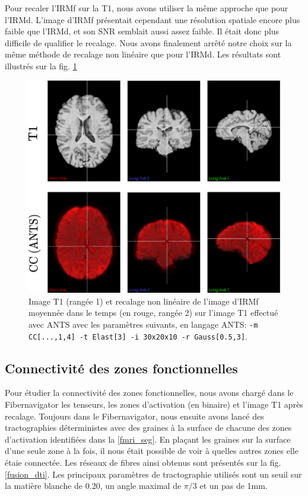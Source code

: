 \documentclass[a4paper]{article}
\begin{document}
Pour recaler l'IRMf sur la T1, nous avons utiliser la même approche que pour l'IRMd. L'image d'IRMf présentait cependant une résolution spatiale encore plus faible que l'IRMd, et son SNR semblait aussi assez faible. Il était donc plus difficile de qualifier le recalage. Nous avons finalement arrêté notre choix sur la même méthode de recalage non linéaire que pour l'IRMd. Les résultats sont illustrés sur la fig. \ref{fmri-to-t1}

\begin{figure}
\begin{center}
\includegraphics[scale=0.5]{fmri-to-t1}
\caption{Image T1 (rangée 1) et recalage non linéaire de l'image d'IRMf moyennée dans le temps (en rouge, rangée 2) sur l'image T1 effectué avec ANTS avec les paramètres suivants, en langage ANTS: \lstinline{-m CC[...,1,4] -t Elast[3] -i 30x20x10 -r Gauss[0.5,3]}. \label{fmri-to-t1}}
\end{center}
\end{figure}  

\subsection{Connectivité des zones fonctionnelles}
Pour étudier la connectivité des zones fonctionnelles, nous avons chargé dans le Fibernavigator les tenseurs, les zones d'activation (en binaire) et l'image T1 après recalage. Toujours dans le Fibernavigator, nous ensuite avons lancé des tractographies déterministes avec des graines à la surface de chacune des zones d'activation identifiées dans la \ref{fmri_seg}. En plaçant les graines sur la surface d'une seule zone à la fois, il nous était possible de voir à quelles autres zones elle étaie connectée. Les réseaux de fibres ainsi obtenus sont présentés sur la fig. \ref{fusion_dti}. Les principaux paramètres de tractographie utilisés sont un seuil sur la matière blanche de 0.20, un angle maximal de $\pi/3$ et un pas de 1mm.
\end{document}
